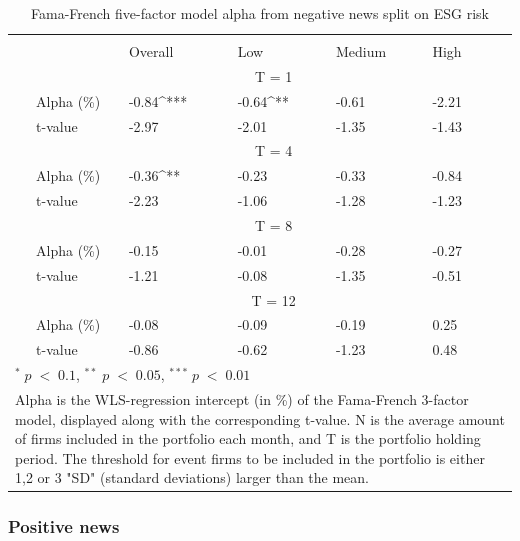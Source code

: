 \setlength{\tabcolsep}{15pt}
\begin{table}[H]
\small
\centering
\caption{Fama-French five-factor model alpha from negative news split on ESG risk} 
\begin{tabular}{llllllc}
\hline \hline \\ 
 &     & Overall &    Low  &  Medium  &  High &  \\    \cline{3-6} 
& &  \multicolumn{3}{c}{ T = 1} & \\ \cline{2-6}
& Alpha (\%)    & -0.84^{***} & -0.64^{**}  & -0.61  & -2.21 &  \\ 
& t-value   & -2.97 & -2.01 & -1.35  & -1.43 &  \\
& &  \multicolumn{3}{c}{ T = 4} & \\ \cline{2-6}
& Alpha (\%)   & -0.36^{**} & -0.23  & -0.33  &  -0.84 & \\
& t-value &   -2.23 & -1.06 & -1.28  & -1.23 & \\
& &  \multicolumn{3}{c}{ T = 8} & \\ \cline{2-6}
& Alpha (\%)    & -0.15 & -0.01   & -0.28  & -0.27 &  \\
& t-value &   -1.21 & -0.08  & -1.35 & -0.51 &  \\
& &  \multicolumn{3}{c}{ T = 12} & \\ \cline{2-6}
& Alpha (\%)    & -0.08 & -0.09  & -0.19  & 0.25 &  \\
& t-value &    -0.86 & -0.62  & -1.23 & 0.48 &  \\
\hline \hline
 \multicolumn{7}{l}{ \footnotesize $^* \; p\; <\; 0.1$, $ ^{**} \; p\; <\; 0.05$, $ ^{***} \; p\; <\; 0.01$  } \\
 \multicolumn{7}{p{12cm}}{ \footnotesize Alpha is the WLS-regression intercept (in \%) of the Fama-French 3-factor model, displayed along with the corresponding t-value. N is the average amount of firms included in the portfolio each month, and T is the portfolio holding period. The threshold for event firms to be included in the portfolio is either 1,2 or 3 "SD" (standard deviations) larger than the mean.} \\ 
 \hline
\end{tabular}
\label{tab: FF5_neg_ESG}
\end{table}




\subsubsection{Positive news}

